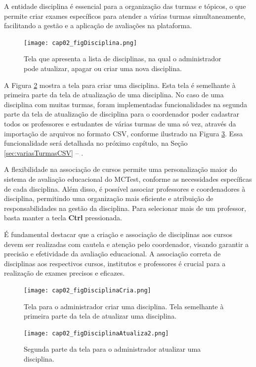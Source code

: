 A entidade disciplina é essencial para a organização das turmas e tópicos, o que permite criar exames específicos para atender a várias turmas simultaneamente, facilitando a gestão e a aplicação de avaliações na plataforma.

\begin{figure}[!ht]
  \centering
  \texttt{[image: cap02\_figDisciplina.png]}
  \caption{Tela que apresenta a lista de disciplinas, na qual o administrador pode atualizar, apagar ou criar uma nova disciplina.}
  \label{fig:cap02_figDisciplina}
\end{figure}

A Figura \ref{fig:cap02_figDisciplinaCria} mostra a tela para criar uma disciplina. Esta tela é semelhante à primeira parte da tela de atualização de uma disciplina. No caso de uma disciplina com muitas turmas, foram implementadas funcionalidades na segunda parte da tela de atualização de disciplina para o coordenador poder cadastrar todos os professores e estudantes de várias turmas de uma só vez, através da importação de arquivos no formato CSV, conforme ilustrado na Figura \ref{fig:cap02_figDisciplinaAtualiza22}. Essa funcionalidade será detalhada no próximo capítulo, na Seção \ref{sec:variasTurmasCSV}  -- .

A flexibilidade na associação de cursos permite uma personalização maior do sistema de avaliação educacional do MCTest, conforme as necessidades específicas de cada disciplina. Além disso, é possível associar professores e coordenadores à disciplina, permitindo uma organização mais eficiente e atribuição de responsabilidades na gestão da disciplina. Para selecionar mais de um professor, basta manter a tecla \textbf{Ctrl} pressionada.

É fundamental destacar que a criação e associação de disciplinas aos cursos devem ser realizadas com cautela e atenção pelo coordenador, visando garantir a precisão e efetividade da avaliação educacional. A associação correta de disciplinas aos respectivos cursos, institutos e professores é crucial para a realização de exames precisos e eficazes.

\begin{figure}[!ht]
  \centering
  \texttt{[image: cap02\_figDisciplinaCria.png]}
  \caption{Tela para o administrador criar uma disciplina. Tela semelhante à primeira parte da tela de atualizar uma disciplina.}
  \label{fig:cap02_figDisciplinaCria}
\end{figure}

\begin{figure}[!ht]
  \centering
  \texttt{[image: cap02\_figDisciplinaAtualiza2.png]}
  \caption{Segunda parte da tela para o administrador atualizar uma disciplina.}
  \label{fig:cap02_figDisciplinaAtualiza22}
\end{figure}

